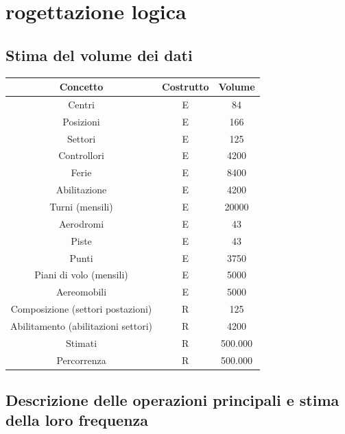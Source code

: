 \chapter{rogettazione logica}
\section{Stima del volume dei dati}
\begin{table}[H]
  \centering
  \begin{tabular}{|c|c|c|}
    \hline
    \rowcolor{green!70!black!80}
    \textbf{Concetto} & \textbf{Costrutto} & \textbf{Volume} \\
    \hline
    Centri & E & 84 \\
    Posizioni & E & 166 \\
    Settori & E & 125 \\
    Controllori & E & 4200 \\
    Ferie & E & 8400 \\
    Abilitazione & E & 4200 \\
    Turni (mensili) & E & 20000 \\
    Aerodromi & E & 43 \\
    Piste & E & 43 \\
    Punti & E & 3750 \\
    Piani di volo (mensili) & E & 5000 \\
    Aereomobili & E & 5000 \\
    Composizione (settori postazioni) & R & 125 \\
    Abilitamento (abilitazioni settori) & R & 4200 \\
    Stimati & R & 500.000 \\
    Percorrenza & R & 500.000 \\
    \hline
  \end{tabular}
  \end{table}
  \section{Descrizione delle operazioni principali e stima della loro frequenza}

